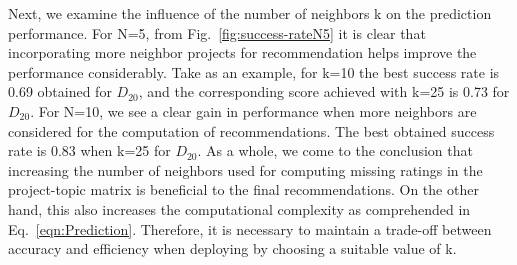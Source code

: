 Next, we examine the influence of the number of neighbors k on the prediction performance. For N=5, from Fig.~\ref{fig:success-rateN5} it is clear that incorporating more neighbor projects for recommendation helps improve the performance considerably. Take as an example, for k=10 the best success rate is 0.69 obtained for $D_{20}$, and the corresponding score achieved with k=25 is 0.73 for $D_{20}$. For N=10, we see a clear gain in performance when more neighbors are considered for the computation of recommendations. The best obtained success rate is 0.83 when k=25 for $D_{20}$. As a whole, we come to the conclusion that increasing the number of neighbors used for computing missing ratings in the project-topic matrix is beneficial to the final recommendations. On the other hand, this also increases the computational complexity as comprehended in Eq.~\ref{eqn:Prediction}. Therefore, it is necessary to maintain a trade-off between accuracy and efficiency when deploying \TF by choosing a suitable value of k. 




